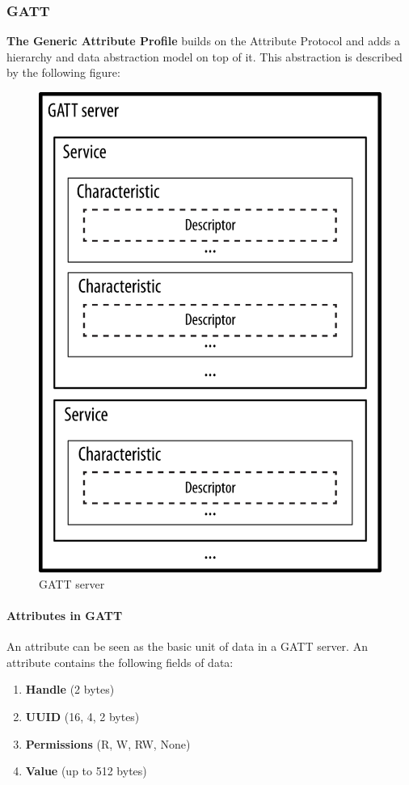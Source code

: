 \subsubsection{GATT}
\textbf{The Generic Attribute Profile} builds on the Attribute Protocol and adds a hierarchy and data abstraction model on top of it. This abstraction is described by the following figure:
\begin{figure}[ht]
	\centering
	\includegraphics[scale=0.2]{images/gatt_server.png}
	\caption{GATT server}
\end{figure}
\paragraph{Attributes in GATT}
An attribute can be seen as the basic unit of data in a GATT server. An attribute contains the following fields of data:
\begin{enumerate}
	\item \textbf{Handle} (2 bytes)
	\item \textbf{UUID} (16, 4, 2 bytes)
	\item \textbf{Permissions} (R, W, RW, None)
	\item \textbf{Value} (up to 512 bytes)
\end{enumerate}
